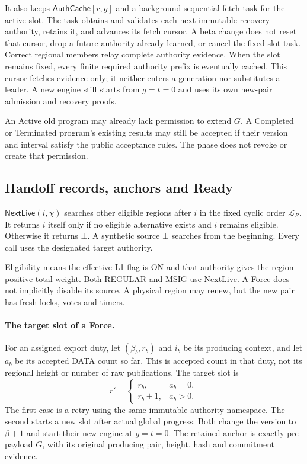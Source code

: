 \documentclass[11pt,a4paper]{article}
\newcommand{\tagg}[1]{\ensuremath{\mathsf{#1}}}
\begin{document}
It also keeps $\tagg{AuthCache}[r,g]$ and a background sequential fetch
task for the active slot. The task obtains and validates each next
immutable recovery authority, retains it, and advances its fetch cursor.
A beta change does not reset that cursor, drop a future authority
already learned, or cancel the fixed-slot task. Correct regional
members relay complete authority evidence. When the slot remains
fixed, every finite required authority prefix is eventually cached.
This cursor fetches evidence only; it neither enters a generation nor
substitutes a leader. A new engine still starts from $g=t=0$ and uses
its own new-pair admission and recovery proofs.

An Active old program may already lack permission to extend $G$.
A Completed or Terminated program's existing results may still be
accepted if their version and interval satisfy the public acceptance
rules. The phase does not revoke or create that permission.

\subsection{Handoff records, anchors and Ready}
\label{sec:witness}
$\tagg{NextLive}(i,\chi)$ searches other eligible regions after $i$
in the fixed cyclic order $\mathcal L_R$. It returns $i$ itself only
if no eligible alternative exists and $i$ remains eligible. Otherwise
it returns $\bot$. A synthetic source $\bot$ searches from the
beginning. Every call uses the designated target authority.

Eligibility means the effective L1 flag is ON and that authority gives
the region positive total weight. Both REGULAR and MSIG use NextLive.
A Force does not implicitly disable its source. A physical region may
renew, but the new pair has fresh locks, votes and timers.

\paragraph{The target slot of a Force.}
\label{sec:retry-slot}
For an assigned export duty, let $(\beta_b,r_b)$ and $i_b$ be its
producing context, and let $a_b$ be its accepted DATA count so far.
This is accepted count in that duty, not its regional height or number
of raw publications. The target slot is
\[
 r'=
 \begin{cases}
 r_b,&a_b=0,\\
 r_b+1,&a_b>0.
 \end{cases}
\]
The first case is a retry using the same immutable authority namespace.
The second starts a new slot after actual global progress. Both change
the version to $\beta+1$ and start their new engine at $g=t=0$.
The retained anchor is exactly pre-payload $G$, with its original
producing pair, height, hash and commitment evidence.
\end{document}
